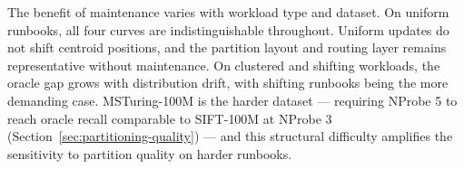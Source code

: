 \documentclass[sigconf,review,anonymous]{acmart}
\begin{document}

The benefit of maintenance varies with workload type and dataset. On uniform runbooks, all four curves are indistinguishable throughout. Uniform updates do not shift centroid positions, and the partition layout and routing layer remains representative without maintenance. On clustered and shifting workloads, the oracle gap grows with distribution drift, with shifting runbooks being the more demanding case. MSTuring-100M is the harder dataset — requiring NProbe 5 to reach oracle recall comparable to SIFT-100M at NProbe 3 (Section~\ref{sec:partitioning-quality}) — and this structural difficulty amplifies the sensitivity to partition quality on harder runbooks.



\end{document}
